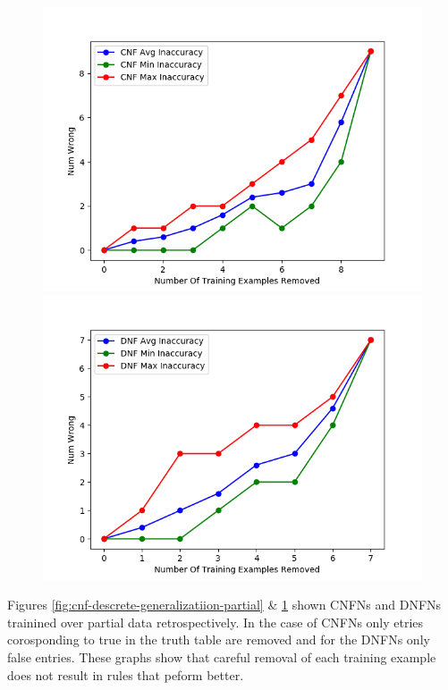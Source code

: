 \begin{figure}[H]
	\centering
	\begin{minipage}[b]{0.45\textwidth}
		\includegraphics[width=\textwidth]{cnf-descrete-generalization-partial.png}
		\caption{}
		\label{fig:cnf-descrete-generalizatiion-partial}
	\end{minipage}
	\begin{minipage}[b]{0.45\textwidth}
		\includegraphics[width=\textwidth]{dnf-descrete-generalization-partial.png}
		\caption{}
		\label{fig:dnf-descrete-generalizatiion-partial}
	\end{minipage}
	\hfill
\end{figure}

Figures \ref{fig:cnf-descrete-generalizatiion-partial} \& \ref{fig:dnf-descrete-generalizatiion-partial} shown CNFNs and DNFNs trainined over partial data retrospectively. In the case of CNFNs only etries corosponding to true in the truth table are removed and for the DNFNs only false entries. These graphs show that careful removal of each training example does not result in rules that peform better.


